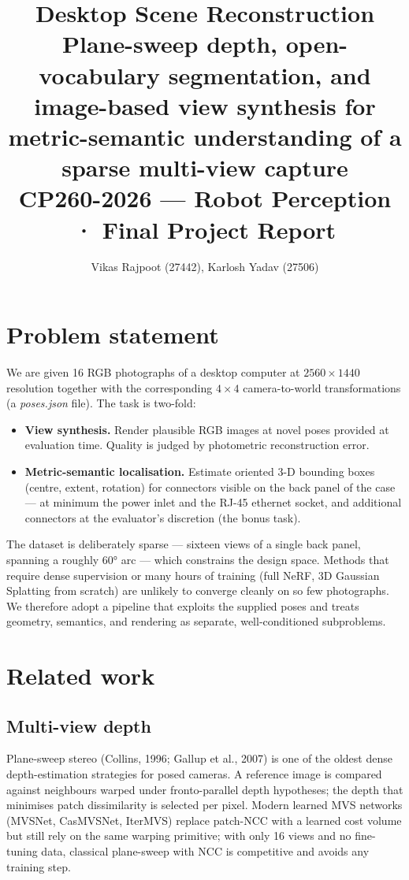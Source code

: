 \documentclass[11pt,a4paper]{article}
\title{\textbf{Desktop Scene Reconstruction}\\[0.3em]
\large Plane-sweep depth, open-vocabulary segmentation, and image-based view synthesis for metric-semantic understanding of a sparse multi-view capture\\[0.5em]
\normalsize CP260-2026 --- Robot Perception · Final Project Report}
\author{Vikas Rajpoot (27442), Karlosh Yadav (27506)}
\date{}
\begin{document}
\maketitle

\section{Problem statement}

We are given 16 RGB photographs of a desktop computer at $2560 \times 1440$ resolution together with the corresponding $4 \times 4$ camera-to-world transformations (a \textit{poses.json} file). The task is two-fold:

\begin{itemize}[leftmargin=1em,itemsep=0.1em]
    \item \textbf{View synthesis.} Render plausible RGB images at novel poses provided at evaluation time. Quality is judged by photometric reconstruction error.
    \item \textbf{Metric-semantic localisation.} Estimate oriented 3-D bounding boxes (centre, extent, rotation) for connectors visible on the back panel of the case --- at minimum the power inlet and the RJ-45 ethernet socket, and additional connectors at the evaluator's discretion (the bonus task).
\end{itemize}

The dataset is deliberately sparse --- sixteen views of a single back panel, spanning a roughly 60° arc --- which constrains the design space. Methods that require dense supervision or many hours of training (full NeRF, 3D Gaussian Splatting from scratch) are unlikely to converge cleanly on so few photographs. We therefore adopt a pipeline that exploits the supplied poses and treats geometry, semantics, and rendering as separate, well-conditioned subproblems.

\section{Related work}

\subsection{Multi-view depth}

Plane-sweep stereo (Collins, 1996; Gallup et al., 2007) is one of the oldest dense depth-estimation strategies for posed cameras. A reference image is compared against neighbours warped under fronto-parallel depth hypotheses; the depth that minimises patch dissimilarity is selected per pixel. Modern learned MVS networks (MVSNet, CasMVSNet, IterMVS) replace patch-NCC with a learned cost volume but still rely on the same warping primitive; with only 16 views and no fine-tuning data, classical plane-sweep with NCC is competitive and avoids any training step.
\end{document}
